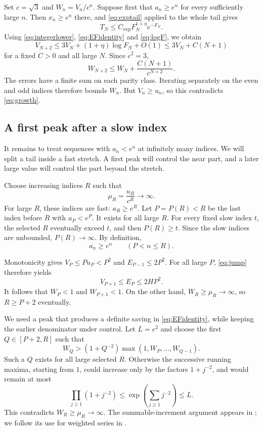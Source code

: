 \documentclass[11pt]{article}
\numberwithin{equation}{section}
\begin{document}
Set $c=\sqrt3$ and $W_n=V_n/c^n$. Suppose first that $a_n\ge e^n$
for every sufficiently large $n$. Then $x_n\ge e^n$ there, and
\eqref{eq:exptail} applied to the whole tail gives
\[
  T_N\le C_{\mathrm{exp}}F_N^{1+\eta}e^{-F_N}.
\]
Using \eqref{eq:integerlower}, \eqref{eq:EFidentity} and \eqref{eq:logF},
we obtain
\[
  V_{N+2}\le 3V_N+(1+\eta)\log F_N+O(1)
           \le 3V_N+C(N+1)
\]
for a fixed $C>0$ and all large $N$. Since $c^2=3$,
\[
  W_{N+2}\le W_N+\frac{C(N+1)}{c^{N+2}}.
\]
The errors have a finite sum on each parity class. Iterating separately
on the even and odd indices therefore bounds $W_n$.
But $V_n\ge u_n$, so this contradicts \eqref{eq:growth}.

\subsection{A first peak after a slow index}

It remains to treat sequences with $a_n<e^n$ at infinitely many
indices. We will split a tail inside a fast stretch. A first peak
will control the near part, and a later large value will control the
part beyond the stretch.

Choose increasing indices $R$ such that
\begin{equation}\label{eq:mu}
  \mu_R=\frac{u_R}{c^R}\longrightarrow\infty.
\end{equation}
For large $R$, these indices are fast: $a_R\ge e^R$.
Let $P=P(R)<R$ be the last index before $R$ with $a_P<e^P$.
It exists for all large $R$. For every fixed slow index $t$, the
selected $R$ eventually exceed $t$, and then $P(R)\ge t$. Since
the slow indices are unbounded, $P(R)\to\infty$. By definition,
\begin{equation}\label{eq:faststretch}
  a_n\ge e^n\qquad(P<n\le R).
\end{equation}

Monotonicity gives $V_P\le P u_P<P^2$ and $E_{P-1}\le2P^2$.
For all large $P$, \eqref{eq:jump} therefore yields
\[
  V_{P+1}\le E_P\le2H P^2.
\]
It follows that $W_P<1$ and $W_{P+1}<1$. On the other hand,
$W_R\ge\mu_R\to\infty$, so $R\ge P+2$ eventually.

We need a peak that produces a definite saving in
\eqref{eq:EFidentity}, while keeping the earlier denominator under
control. Let $L=e^2$ and choose the first $Q\in[P+2,R]$ such that
\begin{equation}\label{eq:peak}
  W_Q>(1+Q^{-2})\max(1,W_P,\ldots,W_{Q-1}).
\end{equation}
Such a $Q$ exists for all large selected $R$. Otherwise the successive
running maxima, starting from $1$, could increase only by the factors
$1+j^{-2}$, and would remain at most
\[
  \prod_{j\ge1}(1+j^{-2})
  \le\exp\left(\sum_{j\ge1}j^{-2}\right)\le L.
\]
This contradicts $W_R\ge\mu_R\to\infty$.
The summable-increment argument appears in \cite[p.~4]{Erdos1975};
we follow its use for weighted series in
\cite[Lemma~9 and Proposition~12]{BKKKZ}.
\end{document}
